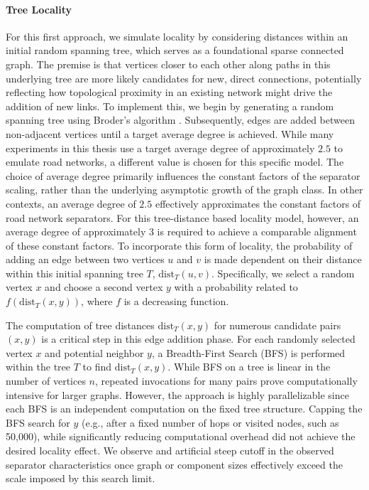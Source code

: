 \paragraph{Tree Locality}
For this first approach, we simulate locality by considering distances within an initial random spanning tree, which serves as a foundational sparse connected graph.
The premise is that vertices closer to each other along paths in this underlying tree are more likely candidates for new, direct connections, potentially reflecting how topological proximity in an existing network might drive the addition of new links.
To implement this, we begin by generating a random spanning tree using Broder's algorithm \cite{broder_generating_1989}.
Subsequently, edges are added between non-adjacent vertices until a target average degree is achieved.
While many experiments in this thesis use a target average degree of approximately \(2.5\) to emulate road networks, a different value is chosen for this specific model.
The choice of average degree primarily influences the constant factors of the separator scaling, rather than the underlying asymptotic growth of the graph class.
In other contexts, an average degree of \(2.5\) effectively approximates the constant factors of road network separators.
For this tree-distance based locality model, however, an average degree of approximately 3 is required to achieve a comparable alignment of these constant factors.
To incorporate this form of locality, the probability of adding an edge between two vertices \(u\) and \(v\) is made dependent on their distance within this initial spanning tree \(T\), \( \text{dist}_T(u, v) \).
Specifically, we select a random vertex \(x\) and choose a second vertex \(y\) with a probability related to \(f(\text{dist}_T(x, y))\), where \(f\) is a decreasing function.

The computation of tree distances \(\text{dist}_T(x, y)\) for numerous candidate pairs \((x,y)\) is a critical step in this edge addition phase.
For each randomly selected vertex \(x\) and potential neighbor \(y\), a Breadth-First Search (BFS) is performed within the tree \(T\) to find \(\text{dist}_T(x, y)\).
While BFS on a tree is linear in the number of vertices \(n\), repeated invocations for many pairs prove computationally intensive for larger graphs.
However, the approach is highly parallelizable since each BFS is an independent computation on the fixed tree structure.
Capping the BFS search for \(y\) (e.g., after a fixed number of hops or visited nodes, such as 50,000), while significantly reducing computational overhead did not achieve the desired locality effect.
We observe and artificial steep cutoff in the observed separator characteristics once graph or component sizes effectively exceed the scale imposed by this search limit.

